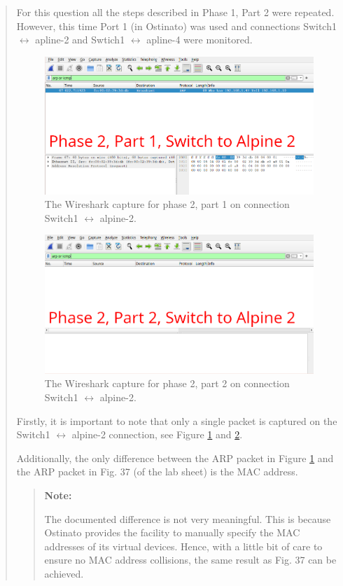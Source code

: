 \documentclass{article}
\newenvironment{ans}
{\fbox{Answer}\begin{quote}\nopagebreak}
{\end{quote}}
\newenvironment{note}{%
\begin{quote}
\begin{tcolorbox}[colback=gray!10,arc=0mm,boxrule=0pt]
\raggedright
\textbf{Note:}%
}{%
\end{tcolorbox}
\end{quote}%
}
\begin{document}
\begin{ans}
For this question all the steps described in Phase 1, Part 2
were repeated. However, this time Port 1 (in Ostinato) was used
and connections Switch1 $\leftrightarrow$ apline-2 and Swtich1
$\leftrightarrow$ apline-4 were monitored.

\begin{figure}[H]
\centering
\includegraphics[width=14cm]{data/q6-phase2-switch-to-alpine2-part1.png}
\caption{The Wireshark capture for phase 2, part 1 on connection Switch1 $\leftrightarrow$ alpine-2.}
\label{fig:wireshark-phase2-part1-for-q6}
\end{figure}

\begin{figure}[H]
\centering
\includegraphics[width=14cm]{data/q6-phase2-switch-to-alpine2-part2.png}
\caption{The Wireshark capture for phase 2, part 2 on connection Switch1 $\leftrightarrow$ alpine-2.}
\label{fig:wireshark-phase2-part2-for-q6}
\end{figure}

Firstly, it is important to note that only a single packet is
captured on the Switch1 $\leftrightarrow$ alpine-2 connection,
see Figure \ref{fig:wireshark-phase2-part1-for-q6} and
\ref{fig:wireshark-phase2-part2-for-q6}.

Additionally, the only difference between the ARP packet in
Figure \ref{fig:wireshark-phase2-part1-for-q6} and the ARP
packet in Fig. 37 (of the lab sheet) is the MAC address.

\begin{note}
The documented difference is not very meaningful. This is
because Ostinato provides the facility to manually specify the
MAC addresses of its virtual devices. Hence, with a little bit
of care to ensure no MAC address collisions, the same result as
Fig. 37 can be achieved.
\end{note}
\end{ans}
\end{document}
